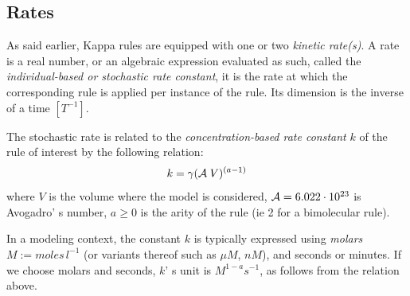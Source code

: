 \documentclass[11pt]{book}
\def\ga{\gamma}
\def\ie{ie }
\def\mit#1{{\mathit #1}}
\begin{document}
\subsection{Rates}\label{sec:kinetics}
As said earlier, Kappa rules are equipped with one or two \emph{kinetic rate(s)}. A rate is a real number, or an algebraic expression evaluated as such, called the \emph{individual-based or stochastic rate constant}, it is the rate at which the corresponding rule is applied per instance of the rule. Its dimension is the inverse of a time $[T^{-1}]$.

The stochastic rate is related to the \emph{concentration-based rate constant} $k$ of the rule of interest by the following relation:
%
%
\begin{equation}\label{stochrate}
k = \ga{({\cal A}\; V)^{(a-1)}} %
\end{equation}
where
$V$ is the volume where the model is considered,
${\cal A}= 6.022\cdot 10^{23}$ is Avogadro' s number, %
$a\geq0$ is the arity of the rule (\ie 2 for a bimolecular rule).

In a modeling context, the constant $k$ is typically expressed using \emph{molars} $M:=\mit{moles}\,l^{-1}$ (or variants thereof such
as $\mu M$, $nM$), and seconds or minutes. If we choose molars and seconds, $k$' s unit is $\mathit{M}^{1-a}\mathit{s}^{-1}$, as
follows from the relation above.
\end{document}
